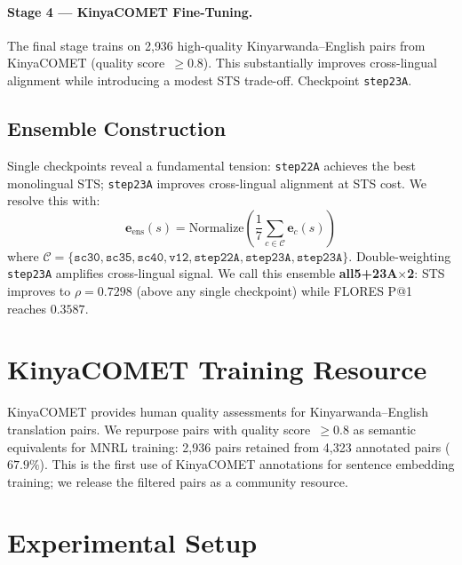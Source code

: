 \documentclass[letterpaper]{article} %
\begin{document}
\paragraph{Stage 4 --- KinyaCOMET Fine-Tuning.}
The final stage trains on 2{,}936 high-quality Kinyarwanda--English pairs from
KinyaCOMET \cite{nzeyimana-etal-2023-kinyacomet} (quality score~$\geq 0.8$).
This substantially improves cross-lingual alignment while introducing a modest
STS trade-off. Checkpoint \texttt{step23A}.

\subsection{Ensemble Construction}

Single checkpoints reveal a fundamental tension: \texttt{step22A} achieves the
best monolingual STS; \texttt{step23A} improves cross-lingual alignment at STS
cost. We resolve this with:
\begin{equation}
  \mathbf{e}_{\mathrm{ens}}(s) = \mathrm{Normalize}\!\left(
    \frac{1}{7} \sum_{c \in \mathcal{C}} \mathbf{e}_c(s)
  \right)
\end{equation}
where $\mathcal{C} = \{\texttt{sc30}, \texttt{sc35}, \texttt{sc40},
\texttt{v12}, \texttt{step22A}, \texttt{step23A}, \texttt{step23A}\}$.
Double-weighting \texttt{step23A} amplifies cross-lingual signal. We call
this ensemble \textbf{all5+23A$\times$2}: STS improves to $\rho = 0.7298$
(above any single checkpoint) while FLORES P@1 reaches $0.3587$.

\section{KinyaCOMET Training Resource}

KinyaCOMET \cite{nzeyimana-etal-2023-kinyacomet} provides human quality
assessments for Kinyarwanda--English translation pairs. We repurpose pairs
with quality score~$\geq 0.8$ as semantic equivalents for MNRL training:
2{,}936 pairs retained from 4{,}323 annotated pairs ($67.9\%$). This is the
first use of KinyaCOMET annotations for sentence embedding training; we release
the filtered pairs as a community resource.

\section{Experimental Setup}
\end{document}
